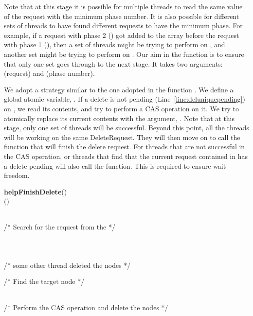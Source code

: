 \documentclass{llncs}
\begin{document}
\begin{appendix}
Note that at this stage it is possible for multiple threads to read the same value of the request with the 
minimum phase number. It is also possible for different sets of threads to have found different requests
to have the minimum phase. For example, if a request with phase 2 () got added to the array before the request with
phase 1 (), then a set of threads might be trying to perform  on , and another set might
be trying to perform  on . Our aim in the  function is to ensure that only
one set goes through to the next stage. It takes two arguments:  (request) and  (phase number).

We adopt a strategy similar to the one adopted in the function . We define a global atomic
variable, . If a delete is not pending (Line~\ref{line:deluniquepending}) 
on , we read its contents, and try to perform a CAS operation on it. We try to atomically
replace its current contents with the argument, . Note that at this stage, only one set of threads
will be successful. Beyond this point, all the threads will be working on the same DeleteRequest. 
They will then move on to call the  function that will finish the delete request. 
For threads that are not successful in the CAS operation, or threads that find that the current request
contained in  has a delete pending will also call the  function. This 
is required to ensure wait freedom. 


\begin{algorithm}
\small
\SetAlgoLined
\textbf{helpFinishDelete}(){}\\
		  () \label{line:currreada} \\
		\If{}
		{
			
		}
\vskip 2mm
			  	 \label{line:endidxa}\\

			/* Search for the request from the  */ \\
			   \\
		       \\	
			\While{  } {
				   \label{line:righta} \\
				   \label{line:lefta}
			}
			\If{} {
				 /* some other thread deleted the nodes */
			} \label{line:sentinela}
		
\vskip 2mm
		/* Find the target node */ \\
		    \label{line:targetstarta}\\
		 \label{line:targetenda}

\vskip 2mm
		/* Perform the CAS operation and delete the nodes */\\
		 \label{line:rightcasa}


\end{algorithm}
\end{appendix}
\end{document}
